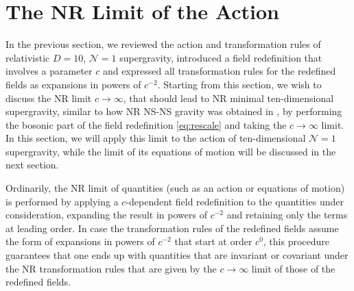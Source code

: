 \documentclass[a4paper,10pt,openany]{article}
\begin{document}
	\section{The NR Limit of the Action} \label{sec:limitaction}
	
	In the previous section, we reviewed the action and transformation rules of relativistic $D=10$, $\mathcal{N}=1$ supergravity, introduced a field redefinition that involves a parameter $c$ and expressed all transformation rules for the redefined fields as expansions in powers of $c^{-2}$. Starting from this section, we wish to discuss the NR limit $c \rightarrow \infty$, that should lead to NR minimal ten-dimensional supergravity, similar to how NR NS-NS gravity was obtained in \cite{Bergshoeff:2021bmc}, by performing the bosonic part of the field redefinition \eqref{eq:rescale} and taking the $c\rightarrow \infty$ limit. In this section, we will apply this limit to the action of ten-dimensional $\mathcal{N}=1$ supergravity, while the limit of its equations of motion will be discussed in the next section.
	
	Ordinarily, the NR limit of quantities (such as an action or equations of motion) is performed by applying a $c$-dependent field redefinition to the quantities under consideration, expanding the result in powers of $c^{-2}$ and retaining only the terms at leading order. In case the transformation rules of the redefined fields assume the form of expansions in powers of $c^{-2}$ that start at order $c^0$, this procedure guarantees that one ends up with quantities that are invariant or covariant under the NR transformation rules that are given by the $c\rightarrow \infty$ limit of those of the redefined fields.
	
\end{document}
